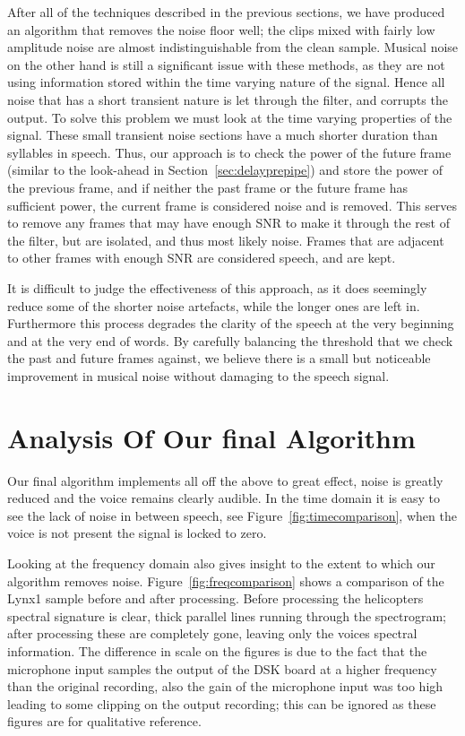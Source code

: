 \documentclass[11pt]{article} %
\begin{document}
{After all of the techniques described in the previous sections, we have produced an algorithm that removes the noise floor well; the clips mixed with fairly low amplitude noise are almost indistinguishable from the clean sample. Musical noise on the other hand is still a significant issue with these methods, as they are not using information stored within the time varying nature of the signal. Hence all noise that has a short transient nature is let through the filter, and corrupts the output.
To solve this problem we must look at the time varying properties of the signal. These small transient noise sections have a much shorter duration than syllables in speech. Thus, our approach is to check the power of the future frame (similar to the look-ahead in Section~\ref{sec:delayprepipe}) and store the power of the previous frame, and if neither the past frame or the future frame has sufficient power, the current frame is considered noise and is removed. This serves to remove any frames that may have enough SNR to make it through the rest of the filter, but are isolated, and thus most likely noise. Frames that are adjacent to other frames with enough SNR are considered speech, and are kept. 

It is difficult to judge the effectiveness of this approach, as it does seemingly reduce some of the shorter noise artefacts, while the longer ones are left in. 
Furthermore this process degrades the clarity of the speech at the very beginning and at the very end of words. By carefully balancing the threshold that we check the past and future frames against, we believe there is a small but noticeable improvement in musical noise without damaging to the speech signal. 

\clearpage

\section{Analysis Of Our final Algorithm} 
Our final algorithm implements all off the above to great effect, noise is greatly reduced and the voice remains clearly audible. In the time domain it is easy to see the lack of noise in between speech, see Figure~\ref{fig:timecomparison}, when the voice is not present the signal is locked to zero. 

Looking at the frequency domain also gives insight to the extent to which our algorithm removes noise. Figure~\ref{fig:freqcomparison} shows a comparison of the Lynx1 sample before and after processing. Before processing the helicopters spectral signature is clear, thick parallel lines running through the spectrogram; after processing these are completely gone, leaving only the voices spectral information. The difference in scale on the figures is due to the fact that the microphone input samples the output of the DSK board at a higher frequency than the original recording, also the gain of the microphone input was too high leading to some clipping on the output recording; this can be ignored as these figures are for qualitative reference.    

}
\end{document}
